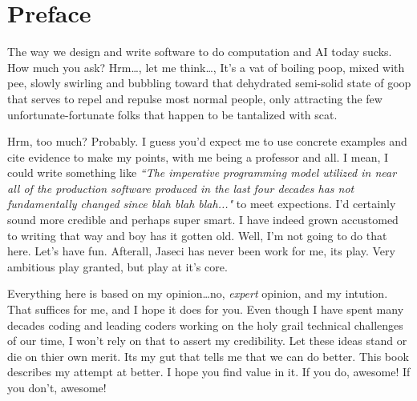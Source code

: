 \chapter*{Preface}

The way we design and write software to do computation and AI today sucks. How much you ask? Hrm\dots, let me think\dots, It's a vat of boiling poop, mixed with pee, slowly swirling and bubbling toward that dehydrated semi-solid state of goop that serves to repel and repulse most normal people, only attracting the few unfortunate-fortunate folks that happen to be tantalized with \gls{scat}.
\par
Hrm, too much? Probably. I guess you'd expect me to use concrete examples and cite evidence to make my points, with me being a professor and all. I mean, I could write something like \textit{``The imperative programming model utilized in near all of the production software produced in the last four decades has not fundamentally changed since blah blah blah..."} to meet expections. I'd certainly sound more credible and perhaps super smart. I have indeed grown accustomed to writing that way and boy has it gotten old. Well, I'm not going to do that here. Let's have fun. Afterall, Jaseci has never been work for me, its play. Very ambitious play granted, but play at it's core.
\par
Everything here is based on my opinion\dots no, \emph{expert} opinion, and my intution. That suffices for me, and I hope it does for you. Even though I have spent many decades coding and leading coders working on the holy grail technical challenges of our time, I won't rely on that to assert my credibility. Let these ideas stand or die on thier own merit. Its my gut that tells me that we can do better. This book describes my attempt at better. I hope you find value in it. If you do, awesome! If you don't, awesome!
